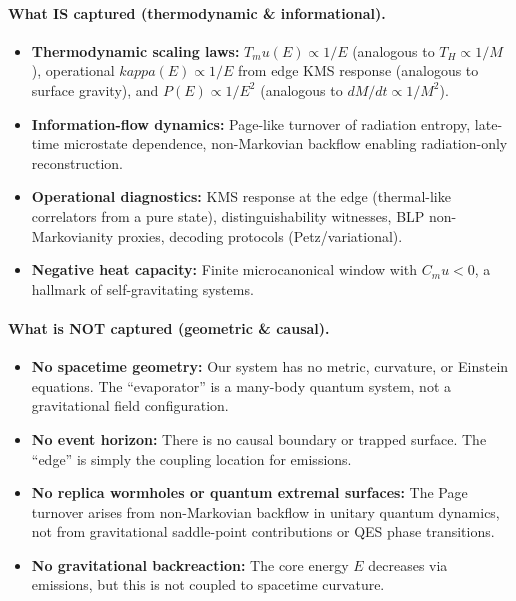 \documentclass[aps,prx,onecolumn,showpacs,superscriptaddress,longbibliography,nofootinbib]{revtex4-2}
\def\kappa{kappa}%
\def\mu{mu}%
\begin{document}
\paragraph*{What IS captured (thermodynamic \& informational).}
\begin{itemize}[leftmargin=*]
\item \textbf{Thermodynamic scaling laws:} $T_\mu(E) \propto 1/E$ (analogous to $T_H \propto 1/M$), operational $\kappa(E) \propto 1/E$ from edge KMS response (analogous to surface gravity), and $P(E) \propto 1/E^2$ (analogous to $dM/dt \propto 1/M^2$).
\item \textbf{Information-flow dynamics:} Page-like turnover of radiation entropy, late-time microstate dependence, non-Markovian backflow enabling radiation-only reconstruction.
\item \textbf{Operational diagnostics:} KMS response at the edge (thermal-like correlators from a pure state), distinguishability witnesses, BLP non-Markovianity proxies, decoding protocols (Petz/variational).
\item \textbf{Negative heat capacity:} Finite microcanonical window with $C_\mu < 0$, a hallmark of self-gravitating systems.
\end{itemize}

\paragraph*{What is NOT captured (geometric \& causal).}
\begin{itemize}[leftmargin=*]
\item \textbf{No spacetime geometry:} Our system has no metric, curvature, or Einstein equations. The ``evaporator'' is a many-body quantum system, not a gravitational field configuration.
\item \textbf{No event horizon:} There is no causal boundary or trapped surface. The ``edge'' is simply the coupling location for emissions.
\item \textbf{No replica wormholes or quantum extremal surfaces:} The Page turnover arises from non-Markovian backflow in unitary quantum dynamics, not from gravitational saddle-point contributions or QES phase transitions.
\item \textbf{No gravitational backreaction:} The core energy $E$ decreases via emissions, but this is not coupled to spacetime curvature.
\end{itemize}
\end{document}
